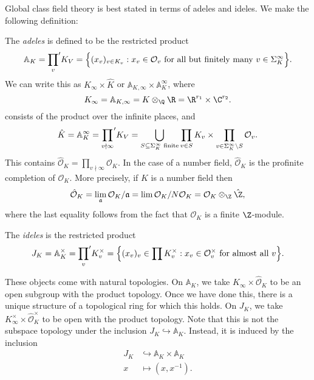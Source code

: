 \documentclass[a4paper]{article}
\newcommand\A{\mathbb{A}}
\newcommand\sprime{\!{\vphantom{\prod}}'}
\begin{document}
Global class field theory is best stated in terms of adeles and ideles. We make the following definition:
\begin{defi}[Adele]
  The \emph{adeles} is defined to be the restricted product
  \[
    \A_K = \prod_v\sprime K_V = \Big\{ (x_v)_{v \in K_v} : x_v \in \mathcal{O}_v \text{ for all but finitely many $v \in \Sigma_K^\infty$}\Big\}.
  \]
  We can write this as $K_\infty \times \hat{K}$ or $\A_{K, \infty} \times \A_K^\infty$, where
  \[
    K_\infty = \A_{K, \infty} = K\otimes_\Q \R = \R^{r_1} \times \C^{r_2}.
  \]
  consists of the product over the infinite places, and
  \[
    \hat{K} = \A_K^\infty = \prod_{v \nmid \infty}\sprime K_V = \bigcup_{S \subseteq \Sigma_K^\infty\text{ finite}} \prod_{v \in S} K_v \times \prod_{v \in \Sigma_K^\infty \setminus S} \mathcal{O}_v.
  \]
  This contains $\hat{\mathcal{O}}_K = \prod_{v \nmid \infty} \mathcal{O}_K$. In the case of a number field, $\hat{\mathcal{O}}_K$ is the profinite completion of $\mathcal{O}_K$. More precisely, if $K$ is a number field then
  \[
    \hat{\mathcal{O}}_K = \lim_{\mathfrak{a}} \mathcal{O}_K/\mathfrak{a} = \lim \mathcal{O}_K/N\mathcal{O}_K = \mathcal{O}_K \otimes_\Z \hat{\Z},
  \]
  where the last equality follows from the fact that $\mathcal{O}_K$ is a finite $\Z$-module.
\end{defi}

\begin{defi}[Idele]
  The \emph{ideles} is the restricted product
  \[
    J_K = \A_K^\times = \prod_v\sprime K_v^\times = \Big\{(x_v)_v \in \prod K_v^\times: x_v \in \mathcal{O}_v^\times\text{ for almost all } v\Big\}.
  \]
\end{defi}
These objects come with natural topologies. On $\A_K$, we take $K_\infty \times \hat{\mathcal{O}}_K$ to be an open subgroup with the product topology. Once we have done this, there is a unique structure of a topological ring for which this holds. On $J_K$, we take $K_\infty^\times \times \hat{\mathcal{O}}_K^\times$ to be open with the product topology. Note that this is not the subspace topology under the inclusion $J_K \hookrightarrow \A_K$. Instead, it is induced by the inclusion
\begin{align*}
  J_K &\hookrightarrow \A_K \times \A_K\\
  x &\mapsto (x, x^{-1}).
\end{align*}
\end{document}
